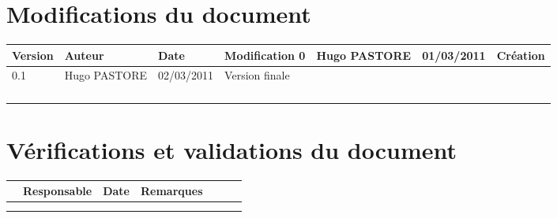 
\section*{Modifications du document}

\begin{center}
\begin{longtable}{|m{14mm}|m{36mm}|m{36mm}|m{60mm}|}
\hline
Version & Auteur & Date & Modification\endhead \hline
0
& %
Hugo PASTORE
& %
01/03/2011
& %
Création
\\\hline
0.1
& %
Hugo PASTORE
& %
02/03/2011
& %
Version finale
\\\hline
& %
& %
& %
\\\hline
& %
& %
& %
\\\hline

& %

& %

& %

\\\hline

& %

& %

& %

\\\hline
\end{longtable}
\end{center}


\section*{Vérifications et validations du document}

\begin{center}
\begin{longtable}{|m{15mm}|m{36mm}|m{36mm}|m{60mm}|}
\hline
 & Responsable & Date & Remarques\endhead \hline
& %
& %
& %
\\\hline
& %
& %
& %
\\\hline
& %
& %
& %
\\\hline
\end{longtable}
\end{center}

\pagebreak
